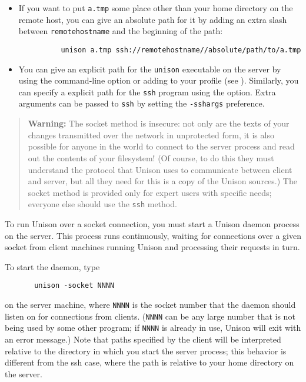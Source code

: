 \documentclass{article}
\begin{document}
\begin{itemize}
\item If you want to put \verb|a.tmp| some place other than your home
directory on the remote host, you can give an absolute path for it by
adding an extra slash between \verb|remotehostname| and the beginning
of the path:
\begin{verbatim}
          unison a.tmp ssh://remotehostname//absolute/path/to/a.tmp
\end{verbatim}

\item You can give an explicit path for the \verb|unison| executable
  on the server by using the command-line option  or adding
   to your profile (see
  ).  Similarly, you can specify a
  explicit path for the \verb|ssh| program using the 
  option.
  Extra arguments can be passed to \verb|ssh| by setting the
  \verb|-sshargs| preference.
\end{itemize}



\begin{quote}
  {\bf\ifhevea\red\fi Warning:} The socket method is 
  insecure: not only are the texts of your changes transmitted over
  the network in unprotected form, it is also possible for anyone in
  the world to connect to the server process and read out the contents
  of your filesystem!  (Of course, to do this they must understand the
  protocol that Unison uses to communicate between client and server,
  but all they need for this is a copy of the Unison sources.)  The socket
  method is provided only for expert users with specific needs; everyone
  else should use the \verb|ssh| method.
\end{quote}

To run Unison over a socket connection, you must start a Unison
daemon process on the server.  This process runs continuously,
waiting for connections over a given socket from client machines
running Unison and processing their requests in turn.

To start the daemon, type
\begin{verbatim}
       unison -socket NNNN
\end{verbatim}
on the server machine, where {\tt NNNN} is the socket number that the
daemon should listen on for connections from clients.  ({\tt NNNN} can
be any large number that is not being used by some other program; if
\texttt{NNNN} is already in use, Unison will exit with an error
message.)  Note that paths specified by the client will be interpreted
relative to the directory in which you start the server process; this
behavior is different from the ssh case, where the path is relative to
your home directory on the server.
\end{document}
